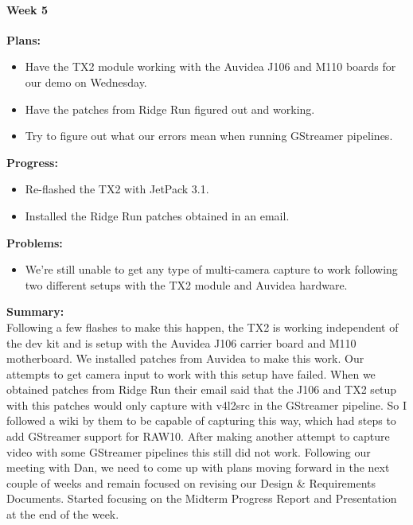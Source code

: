\paragraph{Week 5}
\begin{adjustwidth}{2.5em}{0pt}
    \vspace{-0.5cm}\textbf{Plans:}
    \vspace{-0.5cm}
    \begin{itemize}
        \item Have the TX2 module working with the Auvidea J106 and M110 boards for our demo on Wednesday. 
		\item Have the patches from Ridge Run figured out and working. 
		\item Try to figure out what our errors mean when running GStreamer pipelines. 
    \end{itemize} 
    \vspace{-0.3cm}\textbf{Progress:}
    \vspace{-0.5cm}
    \begin{itemize}
        \item Re-flashed the TX2 with JetPack 3.1.
		\item Installed the Ridge Run patches obtained in an email.  
    \end{itemize} 
    \vspace{-0.3cm}\textbf{Problems:}
    \vspace{-0.5cm}
    \begin{itemize}
        \item We're still unable to get any type of multi-camera capture to work following two different setups with the TX2 module and Auvidea hardware. 
    \end{itemize}  
    \vspace{-0.3cm}\noindent\textbf{Summary:}\\
    \noindent Following a few flashes to make this happen, the TX2 is working independent of the dev kit and is setup with the Auvidea J106 carrier board and M110 motherboard. We installed patches from Auvidea to make this work. Our attempts to get camera input to work with this setup have failed. When we obtained patches from Ridge Run their email said that the J106 and TX2 setup with this patches would only capture with v4l2src in the GStreamer pipeline. So I followed a wiki by them to be capable of capturing this way, which had steps to add GStreamer support for RAW10. After making another attempt to capture video with some GStreamer pipelines this still did not work. Following our meeting with Dan, we need to come up with plans moving forward in the next couple of weeks and remain focused on revising our Design \& Requirements Documents. Started focusing on the Midterm Progress Report and Presentation at the end of the week. 
\end{adjustwidth} 

